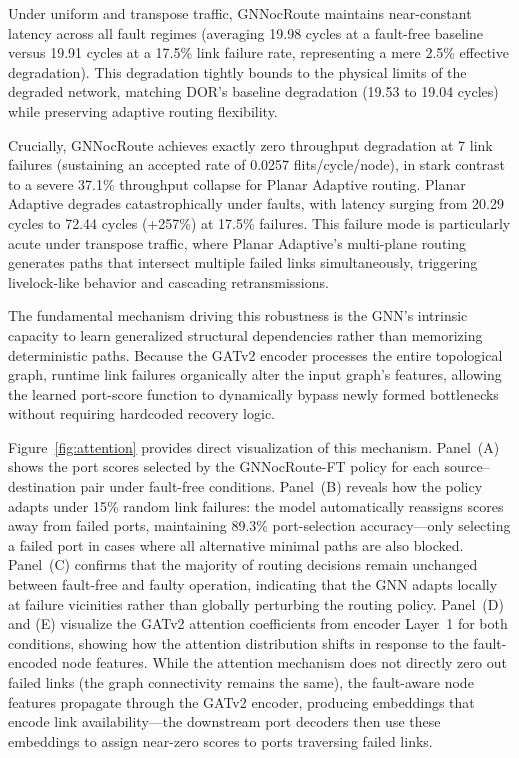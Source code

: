 Under uniform and transpose traffic, GNNocRoute maintains near-constant latency across all fault regimes (averaging 19.98 cycles at a fault-free baseline versus 19.91 cycles at a 17.5\% link failure rate, representing a mere 2.5\% effective degradation). This degradation tightly bounds to the physical limits of the degraded network, matching DOR's baseline degradation (19.53 to 19.04 cycles) while preserving adaptive routing flexibility.

Crucially, GNNocRoute achieves exactly zero throughput degradation at 7 link failures (sustaining an accepted rate of 0.0257 flits/cycle/node), in stark contrast to a severe 37.1\% throughput collapse for Planar Adaptive routing. Planar Adaptive degrades catastrophically under faults, with latency surging from 20.29 cycles to 72.44 cycles (+257\%) at 17.5\% failures. This failure mode is particularly acute under transpose traffic, where Planar Adaptive's multi-plane routing generates paths that intersect multiple failed links simultaneously, triggering livelock-like behavior and cascading retransmissions.

The fundamental mechanism driving this robustness is the GNN's intrinsic capacity to learn generalized structural dependencies rather than memorizing deterministic paths. Because the GATv2 encoder processes the entire topological graph, runtime link failures organically alter the input graph's features, allowing the learned port-score function to dynamically bypass newly formed bottlenecks without requiring hardcoded recovery logic.

Figure~\ref{fig:attention} provides direct visualization of this mechanism. Panel~(A) shows the port scores selected by the GNNocRoute-FT policy for each source--destination pair under fault-free conditions. Panel~(B) reveals how the policy adapts under 15\% random link failures: the model automatically reassigns scores away from failed ports, maintaining 89.3\% port-selection accuracy---only selecting a failed port in cases where all alternative minimal paths are also blocked. Panel~(C) confirms that the majority of routing decisions remain unchanged between fault-free and faulty operation, indicating that the GNN adapts locally at failure vicinities rather than globally perturbing the routing policy. Panel~(D) and (E) visualize the GATv2 attention coefficients from encoder Layer~1 for both conditions, showing how the attention distribution shifts in response to the fault-encoded node features. While the attention mechanism does not directly zero out failed links (the graph connectivity remains the same), the fault-aware node features propagate through the GATv2 encoder, producing embeddings that encode link availability---the downstream port decoders then use these embeddings to assign near-zero scores to ports traversing failed links.

